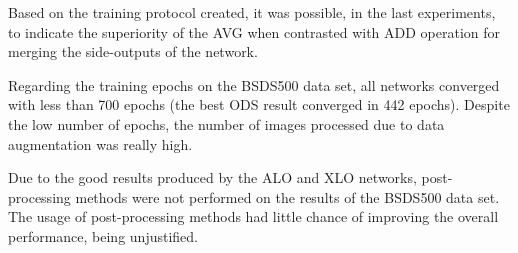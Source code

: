 
Based on the training protocol created, it was possible, in the last experiments, to indicate the superiority of the AVG when contrasted with ADD operation for merging the side-outputs of the network.


Regarding the training epochs on the BSDS500 data set, all networks converged with less than 700 epochs (the best ODS result converged in 442 epochs).
Despite the low number of epochs, the number of images processed due to data augmentation was really high.

Due to the good results produced by the ALO and XLO networks, post-processing methods were not performed on the results of the BSDS500 data set.
The usage of post-processing methods had little chance of improving the overall performance, being unjustified.


